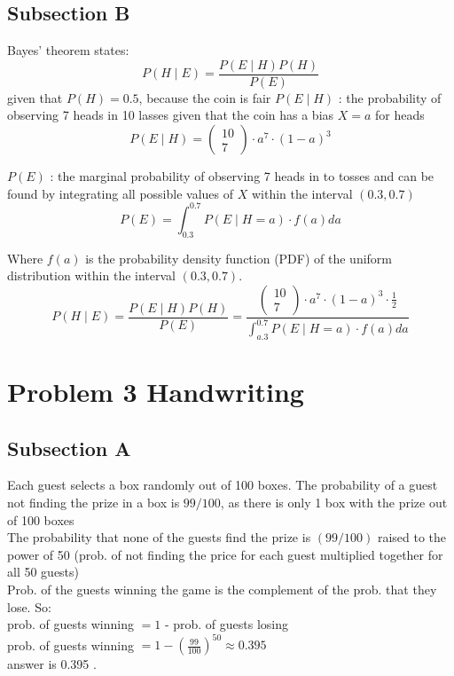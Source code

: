\documentclass[a4paper,11pt]{article}
\theoremstyle{mytheor}
\begin{document}
\subsection{Subsection B}
Bayes' theorem states:
$$
P(H \mid E)=\frac{P(E \mid H) P(H)}{P(E)}
$$
given that $P(H)=0.5$, because the coin is fair
$P(E \mid H)$ : the probability of observing 7 heads in 10 lasses given that the coin has a bias $X=a$ for heads
$$
P(E \mid H)=\left(\begin{array}{c}
10 \\
7
\end{array}\right) \cdot a^7 \cdot(1-a)^3
$$

$P(E)$ : the marginal probability of observing 7 heads in to tosses and can be found by integrating all possible values of $X$ within the interval $(0.3,0.7)$
$$
P(E)=\int_{0.3}^{0.7} P(E \mid H=a) \cdot f(a) d a
$$

Where $f(a)$ is the probability density function (PDF) of the uniform distribution within the interval $(0.3,0.7)$.
$$
P(H \mid E)=\frac{P(E \mid H) P(H)}{P(E)}=\frac{\left(\begin{array}{c}
10 \\
7
\end{array}\right) \cdot a^7 \cdot(1-a)^3 \cdot \frac{1}{2}}{\int_{a .3}^{0.7} P(E \mid H=a) \cdot f(a) d a}
$$

\section{Problem 3 Handwriting}
\subsection{Subsection A}

Each guest selects a box randomly out of 100 boxes. The probability of a guest not finding the prize in a box is $99 / 100$, as there is only 1 box with the prize out of 100 boxes\\

The probability that none of the guests find the prize is $(99 / 100)$ raised to the power of 50 (prob. of not finding the price for each guest multiplied together for all 50 guests)\\

Prob. of the guests winning the game is the complement of the prob. that they lose. So:\\
prob. of guests winning $=1$ - prob. of guests losing\\
prob. of guests winning $=1-\left(\frac{99}{100}\right)^{50} \approx 0.395$\\
answer is 0.395 .
\end{document}
